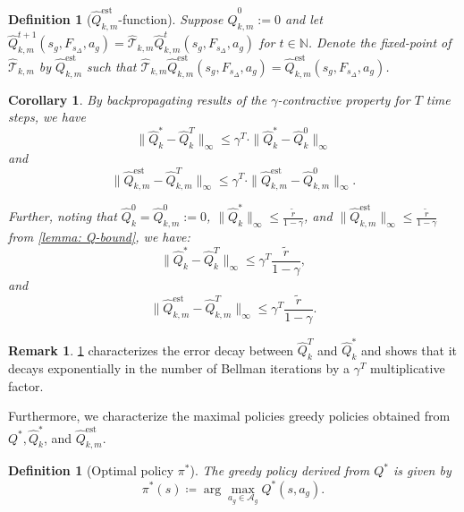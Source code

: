 \documentclass{article}
\theoremstyle{plain}
\newtheorem{corollary}[theorem]{Corollary}
\theoremstyle{definition}
\newtheorem{definition}[theorem]{Definition}
\newtheorem{remark}[theorem]{Remark}
\def\est{\mathrm{est}}
\def\N{\mathbb{N}}
\begin{document}
\begin{definition}[$\hat{Q}_{k,m}^\est$-function]\label{defn:qkmest}\emph{Suppose $\hat{Q}_{k,m}^0:=0$ and let $\hat{Q}_{k,m}^{t+1}(s_g,F_{s_\Delta},a_g) = \hat{\mathcal{T}}_{k,m} \hat{Q}_{k,m}^t(s_g,F_{s_\Delta},a_g)$
    for $t\in\N$. Denote the fixed-point of $\hat{\mathcal{T}}_{k,m}$ by $\hat{Q}^\est_{k,m}$ such that $\hat{\mathcal{T}}_{k,m} \hat{Q}^\est_{k,m}(s_g,F_{s_\Delta},a_g) = \hat{Q}^\est_{k,m}(s_g,F_{s_\Delta},a_g)$.}\\
\end{definition}

\begin{corollary}\label{corollary:backprop}
    \emph{By backpropagating results of the $\gamma$-contractive property for $T$  time steps, we have }\begin{equation}\|\hat{{Q}}_k^* - \hat{{Q}}_k^T\|_\infty \leq \gamma^T \cdot \|\hat{Q}_k^* - \hat{Q}_k^0\|_\infty\end{equation}
    and 
    \begin{equation}
    \|\hat{{Q}}_{k,m}^\est - \hat{{Q}}_{k,m}^T\|_\infty \leq \gamma^T \cdot \|\hat{Q}_{k,m}^\est - \hat{Q}^0_{k,m}\|_\infty.
    \end{equation}
    
Further, noting that $\hat{Q}_k^0 = \hat{Q}_{k,m}^0 := 0$, $\|\hat{Q}_k^*\|_\infty \leq \frac{\tilde{r}}{1-\gamma}$, and $\|\hat{Q}_{k,m}^\est\|_\infty \leq \frac{\tilde{r}}{1-\gamma}$ from \cref{lemma: Q-bound}, we have:
\begin{equation}\label{eqn: qstar,qt decay}\|\hat{Q}_k^* - \hat{Q}_k^T\|_\infty \leq \gamma^T \frac{\tilde{r}}{1-\gamma},\end{equation}
and
\begin{equation}\|\hat{Q}_{k,m}^\est - \hat{Q}_{k,m}^T\|_\infty \leq \gamma^T \frac{\tilde{r}}{1-\gamma}.
    \end{equation}
\end{corollary}

\begin{remark}
\cref{corollary:backprop} characterizes the error decay between $\hat{Q}_k^T$ and $\hat{Q}_k^*$ and shows that it decays exponentially in the number of Bellman iterations by a $\gamma^T$ multiplicative factor.
\end{remark}

Furthermore, we characterize the maximal policies greedy policies obtained from $Q^*, \hat{Q}_k^*$, and $\hat{Q}_{k,m}^\est$.

\begin{definition}[Optimal policy $\pi^*$] \emph{The greedy policy derived from $Q^*$ is given by }\begin{equation}\pi^*(s) \coloneqq \arg\max_{a_g \in\mathcal{A}_g} Q^*(s,a_g).\end{equation}
\end{definition}
\end{document}

